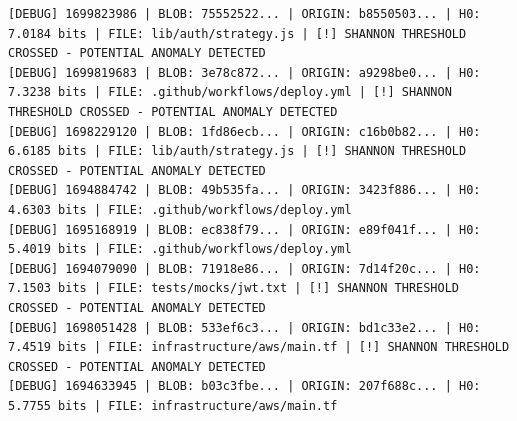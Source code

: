 \documentclass[12pt, a4paper, oneside]{report}
\begin{document}
\begin{lstlisting}[basicstyle=\tiny\ttfamily]
[DEBUG] 1699823986 | BLOB: 75552522... | ORIGIN: b8550503... | H0: 7.0184 bits | FILE: lib/auth/strategy.js | [!] SHANNON THRESHOLD CROSSED - POTENTIAL ANOMALY DETECTED
[DEBUG] 1699819683 | BLOB: 3e78c872... | ORIGIN: a9298be0... | H0: 7.3238 bits | FILE: .github/workflows/deploy.yml | [!] SHANNON THRESHOLD CROSSED - POTENTIAL ANOMALY DETECTED
[DEBUG] 1698229120 | BLOB: 1fd86ecb... | ORIGIN: c16b0b82... | H0: 6.6185 bits | FILE: lib/auth/strategy.js | [!] SHANNON THRESHOLD CROSSED - POTENTIAL ANOMALY DETECTED
[DEBUG] 1694884742 | BLOB: 49b535fa... | ORIGIN: 3423f886... | H0: 4.6303 bits | FILE: .github/workflows/deploy.yml
[DEBUG] 1695168919 | BLOB: ec838f79... | ORIGIN: e89f041f... | H0: 5.4019 bits | FILE: .github/workflows/deploy.yml
[DEBUG] 1694079090 | BLOB: 71918e86... | ORIGIN: 7d14f20c... | H0: 7.1503 bits | FILE: tests/mocks/jwt.txt | [!] SHANNON THRESHOLD CROSSED - POTENTIAL ANOMALY DETECTED
[DEBUG] 1698051428 | BLOB: 533ef6c3... | ORIGIN: bd1c33e2... | H0: 7.4519 bits | FILE: infrastructure/aws/main.tf | [!] SHANNON THRESHOLD CROSSED - POTENTIAL ANOMALY DETECTED
[DEBUG] 1694633945 | BLOB: b03c3fbe... | ORIGIN: 207f688c... | H0: 5.7755 bits | FILE: infrastructure/aws/main.tf
\end{lstlisting}
\end{document}
